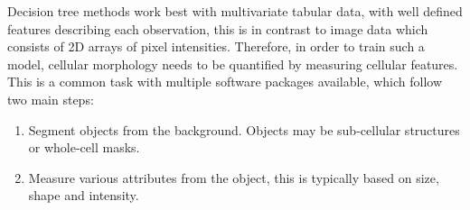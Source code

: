 \documentclass[a4paper,11pt,twoside,openright]{scrbook}
\begin{document}
Decision tree methods work best with multivariate tabular data, with well defined features describing each observation, this is in contrast to image data which consists of 2D arrays of pixel intensities.
Therefore, in order to train such a model, cellular morphology needs to be quantified by measuring cellular features.
This is a common task with multiple software packages available, which follow two main steps:
\begin{enumerate}
    \item Segment objects from the background. Objects may be sub-cellular structures or whole-cell masks.
    \item Measure various attributes from the object, this is typically based on size, shape and intensity.
\end{enumerate}

%


\end{document}
